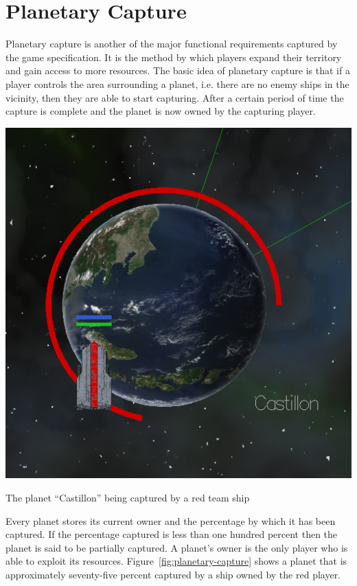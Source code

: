 \section{Planetary Capture}
\label{sec:planetary-capture}

Planetary capture is another of the major functional requirements captured by the
game specification. It is the method by which players expand their territory and
gain access to more resources. The basic idea of planetary capture is that if a
player controls the area surrounding a planet, i.e. there are no enemy ships in the
vicinity, then they are able to start capturing. After a certain period of time
the capture is complete and the planet is now owned by the capturing player.

\begin{marginfigure}
	\includegraphics{res/planetary_capture}
	\caption[An example of planetary capture in Project Serenity]{The planet ``Castillon'' being captured by a red team ship}
	\label{fig:planetary-capture}
\end{marginfigure}

Every planet stores its current owner and the percentage by which it has been captured.
If the percentage captured is less than one hundred percent then the planet is said
to be partially captured. A planet's owner is the only player who is able to exploit
its resources. Figure~\ref{fig:planetary-capture} shows a planet that is approximately
seventy-five percent captured by a ship owned by the red player.

